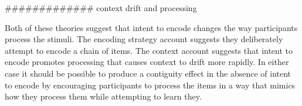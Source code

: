 









#############
context drift and processing




Both of these theories suggest that intent to encode changes the way participants process the stimuli. The encoding strategy account suggests they deliberately attempt to encode a chain of items. The context account suggests that intent to encode promotes processing that causes context to drift more rapidly. In either case it should be possible to produce a contiguity effect in the absence of intent to encode by encouraging participants to process the items in a way that mimics how they process them while attempting to learn they. 



